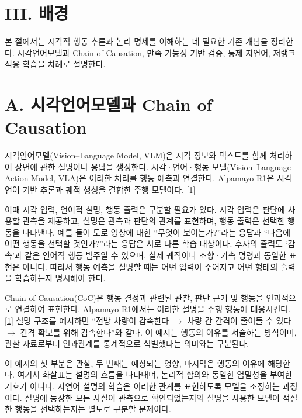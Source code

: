 \documentclass[11pt,a4paper]{article}
\begin{document}
\section*{III. 배경}


본 절에서는 시각적 행동 추론과 논리 명세를 이해하는 데 필요한 기존 개념을 정리한다. 시각언어모델과 Chain of Causation, 만족 가능성 기반 검증, 통제 자연어, 저랭크 적응 학습을 차례로 설명한다.\par

\section*{A. 시각언어모델과 Chain of Causation}

시각언어모델(Vision–Language Model, VLM)은 시각 정보와 텍스트를 함께 처리하여 장면에 관한 설명이나 응답을 생성한다. 시각·언어·행동 모델(Vision–Language–Action Model, VLA)은 이러한 처리를 행동 예측과 연결한다. Alpamayo-R1은 시각언어 기반 추론과 궤적 생성을 결합한 주행 모델이다. \href{\detokenize{https://arxiv.org/abs/2511.00088}}{[1]}\par

이때 시각 입력, 언어적 설명, 행동 출력은 구분할 필요가 있다. 시각 입력은 판단에 사용할 관측을 제공하고, 설명은 관측과 판단의 관계를 표현하며, 행동 출력은 선택한 행동을 나타낸다. 예를 들어 도로 영상에 대한 “무엇이 보이는가?”라는 응답과 “다음에 어떤 행동을 선택할 것인가?”라는 응답은 서로 다른 학습 대상이다. 후자의 출력도 ‘감속’과 같은 언어적 행동 범주일 수 있으며, 실제 궤적이나 조향·가속 명령과 동일한 표현은 아니다. 따라서 행동 예측을 설명할 때는 어떤 입력이 주어지고 어떤 형태의 출력을 학습하는지 명시해야 한다.\par

Chain of Causation(CoC)은 행동 결정과 관련된 관찰, 판단 근거 및 행동을 인과적으로 연결하여 표현한다. Alpamayo-R1에서는 이러한 설명을 주행 행동에 대응시킨다. \href{\detokenize{https://arxiv.org/abs/2511.00088}}{[1]} 설명 구조를 예시하면 “전방 차량이 감속한다 \ensuremath{\rightarrow} 차량 간 간격이 줄어들 수 있다 \ensuremath{\rightarrow} 간격 확보를 위해 감속한다”와 같다. 이 예시는 행동의 이유를 서술하는 방식이며, 관찰 자료로부터 인과관계를 통계적으로 식별했다는 의미와는 구분된다.\par

이 예시의 첫 부분은 관찰, 두 번째는 예상되는 영향, 마지막은 행동의 이유에 해당한다. 여기서 화살표는 설명의 흐름을 나타내며, 논리적 함의와 동일한 엄밀성을 부여한 기호가 아니다. 자연어 설명의 학습은 이러한 관계를 표현하도록 모델을 조정하는 과정이다. 설명에 등장한 모든 사실이 관측으로 확인되었는지와 설명을 사용한 모델이 적절한 행동을 선택하는지는 별도로 구분할 문제이다.\par
\end{document}
